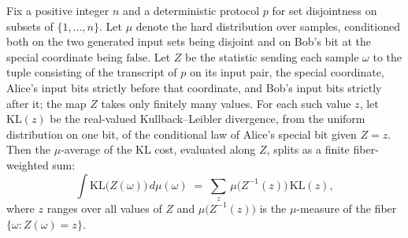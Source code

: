 \begin{theorem}
\label{CommunicationComplexity.Functions.Disjointness.RandomizedLowerBound.integral_xFiberKL_disjointSpecialYFalse_eq_sum_zVariable}
\leanok
{}
Fix a positive integer $n$ and a deterministic protocol $p$ for set disjointness on
subsets of $\{1,\dots,n\}$. Let $\mu$ denote the hard distribution over samples,
conditioned both on the two generated input sets being disjoint and on Bob's bit at the
special coordinate being $\mathrm{false}$. Let $Z$ be the statistic sending each sample
$\omega$ to the tuple consisting of the transcript of $p$ on its input pair, the special
coordinate, Alice's input bits strictly before that coordinate, and Bob's input bits
strictly after it; the map $Z$ takes only finitely many values. For each such value $z$,
let $\mathrm{KL}(z)$ be the real-valued Kullback–Leibler divergence, from the uniform
distribution on one bit, of the conditional law of Alice's special bit given $Z = z$.
Then the $\mu$-average of the KL cost, evaluated along $Z$, splits as a finite
fiber-weighted sum:
\[
\int \mathrm{KL}\bigl(Z(\omega)\bigr)\, d\mu(\omega)
  \;=\; \sum_{z}\, \mu\bigl(Z^{-1}(z)\bigr)\,\mathrm{KL}(z),
\]
where $z$ ranges over all values of $Z$ and $\mu\bigl(Z^{-1}(z)\bigr)$ is the
$\mu$-measure of the fiber $\{\omega : Z(\omega) = z\}$.
\end{theorem}

